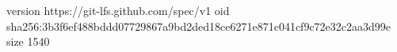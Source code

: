 version https://git-lfs.github.com/spec/v1
oid sha256:3b3f6ef488bddd07729867a9bd2ded18ce6271e871c041cf9c72e32c2aa3d99e
size 1540
